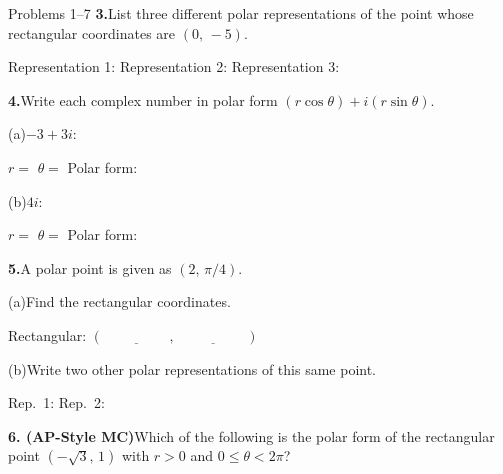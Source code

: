 \documentclass[10pt]{article}
\begin{document}
\begin{notesbox}{Problems 1--7}
\vspace{0.14in}
\textbf{3.}\quad List three different polar representations of the point whose
rectangular coordinates are $(0,\, -5)$.

\vspace{4pt}
Representation 1: \underline{\hspace{4cm}} \quad
Representation 2: \underline{\hspace{4cm}} \quad
Representation 3: \underline{\hspace{4cm}}

\vspace{0.14in}
\textbf{4.}\quad Write each complex number in polar form $(r\cos\theta)+i(r\sin\theta)$.

\vspace{4pt}
(a)\quad $-3 + 3i$:

\vspace{4pt}
$r = $ \underline{\hspace{2cm}} \qquad $\theta = $ \underline{\hspace{3cm}} \qquad
Polar form: \underline{\hspace{5cm}}

\vspace{8pt}
(b)\quad $4i$:

\vspace{4pt}
$r = $ \underline{\hspace{2cm}} \qquad $\theta = $ \underline{\hspace{3cm}} \qquad
Polar form: \underline{\hspace{5cm}}

\vspace{0.14in}
\textbf{5.}\quad A polar point is given as $(2,\, \pi/4)$.

\vspace{4pt}
(a)\quad Find the rectangular coordinates.

\vspace{4pt}
Rectangular: $(\underline{\hspace{2cm}},\; \underline{\hspace{2cm}})$

\vspace{6pt}
(b)\quad Write two other polar representations of this same point.

\vspace{4pt}
Rep.\ 1: \underline{\hspace{4cm}} \qquad Rep.\ 2: \underline{\hspace{4cm}}

\vspace{0.14in}
\textbf{6. (AP-Style MC)}\quad Which of the following is the polar form of the
rectangular point $(-\sqrt{3},\, 1)$ with $r > 0$ and $0 \le \theta < 2\pi$?


\end{notesbox}
\end{document}
